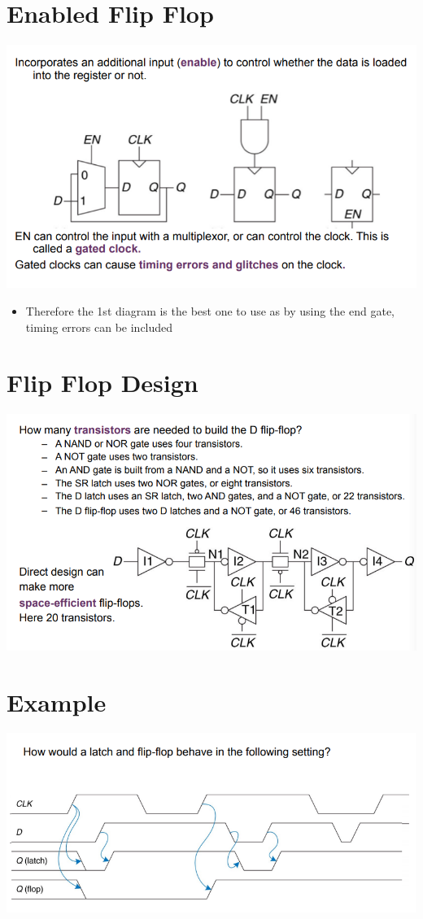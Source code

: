 \documentclass{article}[18pt]
\begin{document}
\section{Enabled Flip Flop}
\begin{center}
	\includegraphics[scale=0.7]{figure8}
\end{center}
\begin{itemize}
	\item Therefore the 1st diagram is the best one to use as by using the end gate, timing errors can be included
\end{itemize}
\section{Flip Flop Design}
\begin{center}
	\includegraphics[scale=0.7]{figure9}
\end{center}
\section{Example}
\begin{center}
	\includegraphics[scale=0.7]{figure10}
\end{center}
\end{document}
